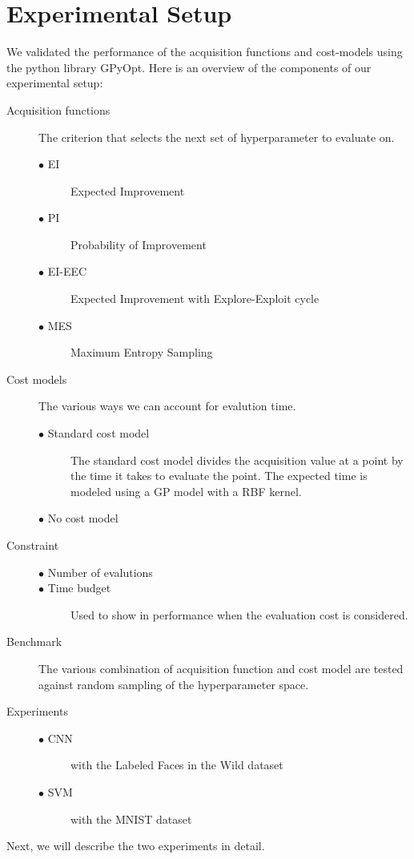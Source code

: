 \documentclass[letterpaper]{article}
\begin{document}
\section{Experimental Setup}
We validated the performance of the acquisition functions and cost-models using the python library GPyOpt.
Here is an overview of the components of our experimental setup:

\begin{description}
\item[Acquisition functions] The criterion that selects the next set of hyperparameter to evaluate on.
	\begin{description}
	\item [$\bullet$ EI] Expected Improvement
	\item [$\bullet$ PI] Probability of Improvement
	\item [$\bullet$ EI-EEC] Expected Improvement with Explore-Exploit cycle
	\item [$\bullet$ MES] Maximum Entropy Sampling
	\end{description}
\item[Cost models] The various ways we can account for evalution time.
	\begin{description}
	\item [$\bullet$ Standard cost model] The standard cost model divides the acquisition value at a point by the time it takes to evaluate the point.
						       The expected time is modeled using a GP model with a RBF kernel.
	\item [$\bullet$ No cost model]
	\end{description}
\item[Constraint] \leavevmode
	\begin{description}
	\item [$\bullet$ Number of evalutions] \leavevmode
	\item [$\bullet$ Time budget] Used to show in performance when the evaluation cost is considered.
	\end{description}
\item[Benchmark] The various combination of acquisition function and cost model are tested against random sampling of the hyperparameter space.
\item[Experiments] \leavevmode
	\begin{description}
	\item [$\bullet$ CNN] with the Labeled Faces in the Wild dataset
	\item [$\bullet$ SVM] with the MNIST dataset
	\end{description}
\end{description}
Next, we will describe the two experiments in detail.
\end{document}
